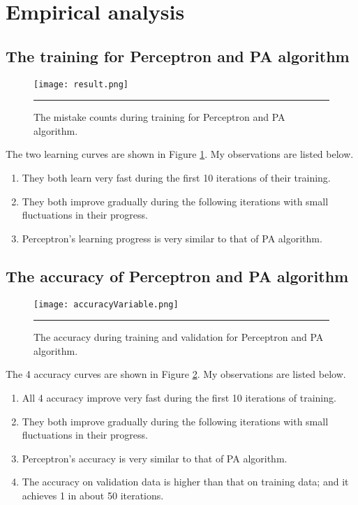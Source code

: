 \documentclass[12pt]{article}
\begin{document}
\section{Empirical analysis}
\subsection{The training for Perceptron and PA algorithm}
\begin{figure}[htb]
  \centering
      {\texttt{[image: result.png]}} \rule{1\linewidth}{1pt}
      \caption{The mistake counts during training for Perceptron and PA algorithm.}
      \label{fig:result}
\end{figure}
The two learning curves are shown in Figure \ref{fig:result}. My observations are listed below.
\begin{enumerate}
  \item They both learn very fast during the first 10 iterations of their training.
  \item They both improve gradually during the following iterations with small fluctuations in their progress.
  \item Perceptron's learning progress is very similar to that of PA algorithm.
\end{enumerate}
\subsection{The accuracy of Perceptron and PA algorithm}
\begin{figure}[htb]
  \centering
      {\texttt{[image: accuracyVariable.png]}} \rule{1\linewidth}{1pt}
      \caption{The accuracy during training and validation for Perceptron and PA algorithm.}
      \label{fig:accuracy}
\end{figure}
The 4 accuracy curves are shown in Figure \ref{fig:accuracy}. My observations are listed below.
\begin{enumerate}
  \item All 4 accuracy improve very fast during the first 10 iterations of training.
  \item They both improve gradually during the following iterations with small fluctuations in their progress.
  \item Perceptron's accuracy is very similar to that of PA algorithm.
  \item The accuracy on validation data is higher than that on training data; and it achieves 1 in about 50 iterations.
\end{enumerate}
\end{document}
